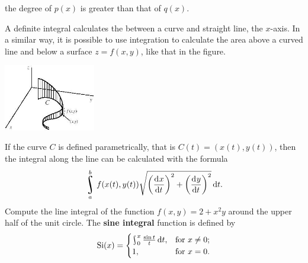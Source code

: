 \begin{questions}
\begin{parts}
\begin{subparts}
          \subpart the degree of $ p(x) $ is greater than that of $ q(x) $.
        \end{subparts}
    \end{parts}
  \questioS A definite integral calculates the between a curve and straight line, the $ x$-axis. In a similar way, it is possible
            to use integration to calculate the area above a curved line and below a surface $ z = f(x,y) $, like that in the figure.
            \begin{center}
              \includegraphics[width=0.3\textwidth]{contourintegral}
            \end{center}
            If the curve $ C $ is defined parametrically, that is $ C(t) = (x(t), y(t)) $, then the integral along the line can be
            calculated with the formula
            \begin{displaymath}
              \rint_a^b f(x(t), y(t)) \sqrt{\left(\dod{x}{t}\right)^2 + \left(\dod{y}{t}\right)^2} \dif{t}.
            \end{displaymath}
            Compute the line integral of the function $ f(x,y) = 2 + x^2 y $ around the upper half of the unit circle.
  \questioS The \textbf{sine integral} function is defined by
            \begin{displaymath}
              \mathrm{Si}(x) =
              \begin{cases}
                \rint^x_0 \frac{\sin t}{t} \dif{t}, &\text{for $ x \neq 0 $;}\\
                1, &\text{for $ x = 0 $.}
              \end{cases}
            \end{displaymath}
\end{questions}
